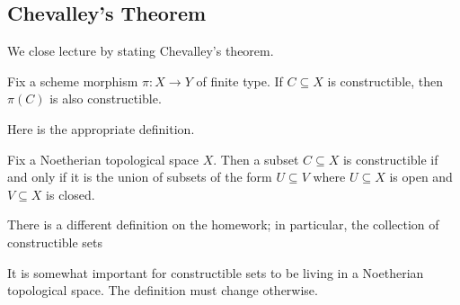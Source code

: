 \documentclass[../notes.tex]{subfiles}
\begin{document}
\subsection{Chevalley's Theorem}
We close lecture by stating Chevalley's theorem.
\begin{theorem}[Chevalley]
	Fix a scheme morphism $\pi\colon X\to Y$ of finite type. If $C\subseteq X$ is constructible, then $\pi(C)$ is also constructible.
\end{theorem}
Here is the appropriate definition.
\begin{definition}[Constructible]
	Fix a Noetherian topological space $X$. Then a subset $C\subseteq X$ is constructible if and only if it is the union of subsets of the form $U\subseteq V$ where $U\subseteq X$ is open and $V\subseteq X$ is closed.
\end{definition}
There is a different definition on the homework; in particular, the collection of constructible sets
\begin{remark}
	It is somewhat important for constructible sets to be living in a Noetherian topological space. The definition must change otherwise.
\end{remark}
\end{document}
